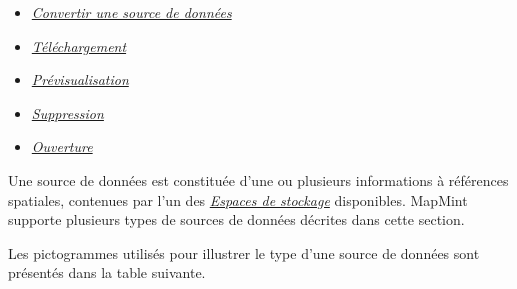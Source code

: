 \documentclass[letterpaper,10pt,french]{sphinxmanual}
\begin{document}
{\begin{minipage}{0.95\linewidth}
\begin{itemize}
\begin{itemize}
\begin{itemize}
\item {} 
\label{data/datasources:id12}{\hyperref[data/datasources:convertir-une-source-de-donnees]{\emph{Convertir une source de données}}}

\item {} 
\label{data/datasources:id13}{\hyperref[data/datasources:telechargement]{\emph{Téléchargement}}}

\item {} 
\label{data/datasources:id14}{\hyperref[data/datasources:previsualisation]{\emph{Prévisualisation}}}

\item {} 
\label{data/datasources:id15}{\hyperref[data/datasources:suppression]{\emph{Suppression}}}

\item {} 
\label{data/datasources:id16}{\hyperref[data/datasources:ouverture]{\emph{Ouverture}}}

\end{itemize}

\end{itemize}

\end{itemize}
\end{minipage}}
\begin{center}\setlength{\fboxsep}{5pt}\end{center}

Une source de données est constituée d'une ou plusieurs informations à références spatiales, contenues par l'un des {\hyperref[data/datastores::doc]{\emph{\emph{Espaces de stockage}}}} disponibles. MapMint supporte plusieurs types de sources de données décrites dans cette section.

Les pictogrammes utilisés pour illustrer le type d'une source de
données sont présentés dans la table suivante.
\end{document}
